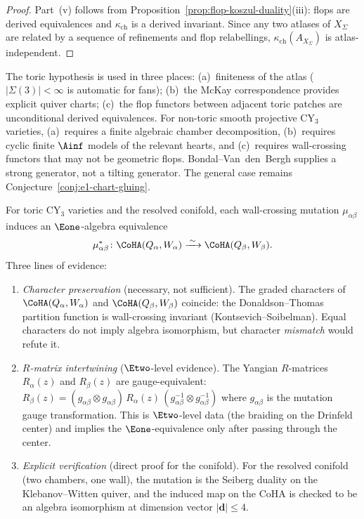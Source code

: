 \begin{proof}
Part~(v) follows from Proposition~\ref{prop:flop-koszul-duality}(iii): flops are derived equivalences and $\kappa_{\mathrm{ch}}$ is a derived invariant. Since any two atlases of $X_\Sigma$ are related by a sequence of refinements and flop relabellings, $\kappa_{\mathrm{ch}}(A_{X_\Sigma})$ is atlas-independent.

\medskip
\end{proof}

\begin{remark}
\label{rem:toric-chart-gluing-scope}
The toric hypothesis is used in three places: (a)~finiteness of the atlas ($|\Sigma(3)| < \infty$ is automatic for fans); (b)~the McKay correspondence provides explicit quiver charts; (c)~the flop functors between adjacent toric patches are unconditional derived equivalences. For non-toric smooth projective CY$_3$ varieties, (a)~requires a finite algebraic chamber decomposition, (b)~requires cyclic finite $\Ainf$ models of the relevant hearts, and (c)~requires wall-crossing functors that may not be geometric flops. Bondal--Van~den~Bergh supplies a strong generator, not a tilting generator. The general case remains Conjecture~\ref{conj:e1-chart-gluing}.
\end{remark}


\begin{proposition}[Transition = \texorpdfstring{$\Eone$}{E1} equivalence]
\label{prop:transition-e1-equiv}
For toric CY$_3$ varieties and the resolved conifold, each wall-crossing mutation $\mu_{\alpha\beta}$ induces an $\Eone$-algebra equivalence
\[
 \mu_{\alpha\beta}^* \colon \CoHA(Q_\alpha, W_\alpha) \xrightarrow{\;\sim\;} \CoHA(Q_\beta, W_\beta).
\]
Three lines of evidence:
\begin{enumerate}[label=\textup{(\roman*)}]
 \item \emph{Character preservation} (necessary, not sufficient). The graded characters of $\CoHA(Q_\alpha, W_\alpha)$ and $\CoHA(Q_\beta, W_\beta)$ coincide: the Donaldson--Thomas partition function is wall-crossing invariant (Kontsevich--Soibelman). Equal characters do not imply algebra isomorphism, but character \emph{mismatch} would refute it.
 \item \emph{$R$-matrix intertwining} ($\Etwo$-level evidence). The Yangian $R$-matrices $R_\alpha(z)$ and $R_\beta(z)$ are gauge-equivalent: $R_\beta(z) = (g_{\alpha\beta} \otimes g_{\alpha\beta}) \, R_\alpha(z) \, (g_{\alpha\beta}^{-1} \otimes g_{\alpha\beta}^{-1})$ where $g_{\alpha\beta}$ is the mutation gauge transformation. This is $\Etwo$-level data (the braiding on the Drinfeld center) and implies the $\Eone$-equivalence only after passing through the center.
 \item \emph{Explicit verification} (direct proof for the conifold). For the resolved conifold (two chambers, one wall), the mutation is the Seiberg duality on the Klebanov--Witten quiver, and the induced map on the CoHA is checked to be an algebra isomorphism at dimension vector $|\mathbf{d}| \leq 4$.
\end{enumerate}
\end{proposition}

